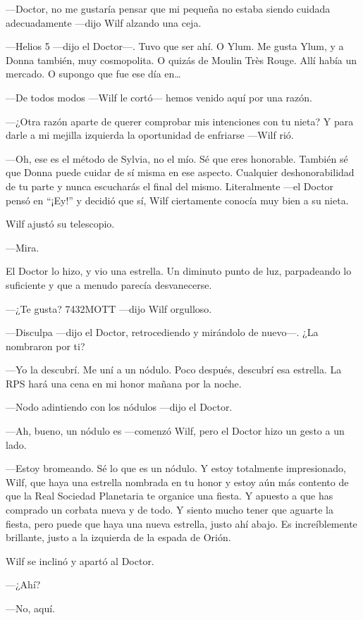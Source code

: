 ---Doctor, no me gustaría pensar que mi pequeña no estaba siendo cuidada
adecuadamente ---dijo Wilf alzando una ceja.

---Helios 5 ---dijo el Doctor---. Tuvo que ser ahí. O Ylum. Me gusta
Ylum, y a Donna también, muy cosmopolita. O quizás de Moulin Très Rouge.
Allí había un mercado. O supongo que fue ese día en\ldots{}~

---De todos modos ---Wilf le cortó--- hemos venido aquí por una razón.

---¿Otra razón aparte de querer comprobar mis intenciones con tu nieta?
Y para darle a mi mejilla izquierda la oportunidad de enfriarse ---Wilf
rió.

---Oh, ese es el método de Sylvia, no el mío. Sé que eres honorable.
También sé que Donna puede cuidar de sí misma en ese aspecto. Cualquier
deshonorabilidad de tu parte y nunca escucharás el final del mismo.
Literalmente ---el Doctor pensó en ``¡Ey!'' y decidió que sí, Wilf
ciertamente conocía muy bien a su nieta.

Wilf ajustó su telescopio.

---Mira.

El Doctor lo hizo, y vio una estrella. Un diminuto punto de luz,
parpadeando lo suficiente y que a menudo parecía desvanecerse.

---¿Te gusta? 7432MOTT ---dijo Wilf orgulloso.

---Disculpa ---dijo el Doctor, retrocediendo y mirándolo de nuevo---.
¿La nombraron por ti?

---Yo la descubrí. Me uní a un nódulo. Poco después, descubrí esa
estrella. La RPS hará una cena en mi honor mañana por la noche.

---Nodo adintiendo con los nódulos ---dijo el Doctor.

---Ah, bueno, un nódulo es ---comenzó Wilf, pero el Doctor hizo un gesto
a un lado.

---Estoy bromeando. Sé lo que es un nódulo. Y estoy totalmente
impresionado, Wilf, que haya una estrella nombrada en tu honor y estoy
aún más contento de que la Real Sociedad Planetaria te organice una
fiesta. Y apuesto a que has comprado un corbata nueva y de todo. Y
siento mucho tener que aguarte la fiesta, pero puede que haya una nueva
estrella, justo ahí abajo. Es increíblemente brillante, justo a la
izquierda de la espada de Orión.

Wilf se inclinó y apartó al Doctor.

---¿Ahí?

---No, aquí.

